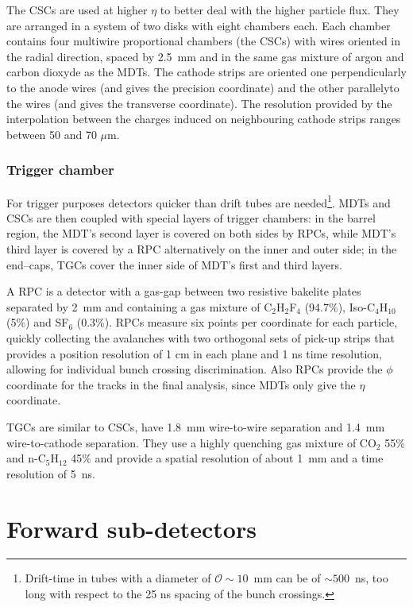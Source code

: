 The CSCs are used at higher $\eta$ to better deal with the higher particle flux.
They are arranged in a system of two disks with eight chambers each. Each chamber
contains four multiwire proportional chambers (the CSCs) with wires oriented in the radial direction,
spaced by 2.5~mm and in the same gas mixture of argon and carbon dioxyde as the MDTs.
The cathode strips are oriented one perpendicularly to the anode wires (and gives the precision coordinate)
and the other parallelyto the wires (and gives the transverse coordinate).
The resolution provided by the interpolation between the charges induced on neighbouring cathode strips
ranges between 50 and 70 $\mu$m.

\subsubsection{Trigger chamber}

For trigger purposes detectors quicker than drift tubes are needed\footnote{Drift-time in tubes with a diameter of 
$\mathcal{O}\sim 10$~mm can be of $\sim500$~ns, too long with respect to the 25 ns spacing of the bunch crossings.}.
MDTs and CSCs are then coupled with special layers of trigger chambers: in the barrel region, the MDT's second layer
is covered on both sides by RPCs, while MDT's third layer is covered by a RPC alternatively on the inner and outer side;
in the end–caps, TGCs cover the inner side of MDT's first and third layers. 

A RPC is a detector with a gas-gap between two resistive bakelite plates separated by 2~mm and containing
a gas mixture of C$_{2}$H$_{2}$F$_{4}$ (94.7\%), Iso-C$_{4}$H$_{10}$ (5\%) and SF$_{6}$ (0.3\%). 
RPCs measure six points per coordinate for each particle, quickly collecting the avalanches with two 
orthogonal sets of pick-up strips that provides a position resolution of 1 cm in each plane and 1 ns time resolution,
allowing for individual bunch crossing discrimination. Also RPCs provide the $\phi$ coordinate for the tracks in
the final analysis, since MDTs only give the $\eta$ coordinate.

TGCs are similar to CSCs, have 1.8~mm wire-to-wire separation and 
1.4~mm wire-to-cathode separation. They use a highly quenching gas mixture of CO$_{2}$ 55\% and n-C$_{5}$H$_{12}$ 45\%
and provide  a spatial resolution of about 1~mm and a time resolution of 5~ns.

\section{Forward sub-detectors}\label{sec:forward}

